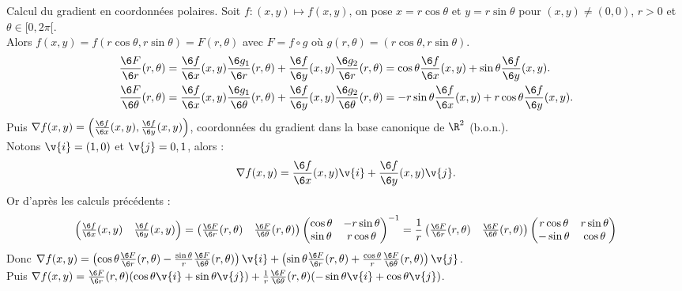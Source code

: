\documentclass[11pt]{article}
\begin{document}
\begin{exercice}{Calcul du gradient en coordonnées polaires.}{}
    Soit $f:(x,y)\mapsto f(x,y)$, on pose $x=r\cos\theta$ et $y=r\sin\theta$ pour $(x,y)\neq(0,0)$, $r>0$ et $\theta\in[0,2\pi[$.\\
    Alors $f(x,y)=f(r\cos\theta, r\sin\theta)=F(r,\theta)$ avec $F=f\circ g$ où $g(r,\theta)=(r\cos\theta,r\sin\theta)$.
    \begin{align*}
        &\frac{\6 F}{\6 r}(r,\theta) = \frac{\6 f}{\6 x}(x,y)\frac{\6 g_1}{\6 r}(r,\theta) + \frac{\6 f}{\6 y}(x,y)\frac{\6 g_2}{\6 r}(r,\theta) = \cos\theta\frac{\6 f}{\6 x}(x,y) + \sin\theta\frac{\6 f}{\6 y}(x,y).\\
        &\frac{\6 F}{\6 \theta}(r,\theta) = \frac{\6 f}{\6 x}(x,y)\frac{\6 g_1}{\6 \theta}(r, \theta) + \frac{\6 f}{\6 y}(x,y)\frac{\6 g_2}{\6 \theta}(r,\theta) = -r\sin\theta\frac{\6 f}{\6 x}(x,y)+r\cos\theta\frac{\6 f}{\6 y}(x,y).
    \end{align*} 
    Puis $\nabla f(x,y) = \left(\frac{\6 f}{\6 x}(x,y), \frac{\6 f}{\6 y}(x,y) \right)$, coordonnées du gradient dans la base canonique de $\R^2$ (b.o.n.).\\
    Notons $\v{i}=(1,0)$ et $\v{j}=0,1$, alors :
    \begin{equation*}
        \nabla f(x,y) = \frac{\6 f}{\6 x}(x,y)\v{i} + \frac{\6 f}{\6 y}(x,y)\v{j}.
    \end{equation*}
    Or d'après les calculs précédents :
    \begin{equation*}
        \begin{pmatrix} \frac{\6 f}{\6 x}(x,y) & \frac{\6 f}{\6 y}(x,y) \end{pmatrix} = \begin{pmatrix}\frac{\6 F}{\6 r}(r,\theta) & \frac{\6 F}{\6 \theta}(r,\theta)\end{pmatrix}\begin{pmatrix}\cos \theta & -r\sin \theta \\ \sin\theta & r\cos\theta\end{pmatrix}^{-1} = \frac{1}{r}\begin{pmatrix}\frac{\6 F}{\6 r}(r,\theta) & \frac{\6 F}{\6 \theta}(r,\theta)\end{pmatrix}\begin{pmatrix}r\cos\theta&r\sin\theta\\-\sin\theta&\cos\theta\end{pmatrix}
    \end{equation*}
    Donc $\nabla f(x,y) = \left( \cos\theta \frac{\6 F}{\6 r}(r,\theta) - \frac{\sin \theta}{r}\frac{\6 F}{\6 \theta}(r,\theta) \right)\v{i} + \left( \sin\theta\frac{\6 F}{\6 r}(r,\theta) + \frac{\cos\theta}{r}\frac{\6 F}{\6 \theta}(r,\theta) \right)\v{j}$.\\
    Puis $\nabla f(x,y) = \frac{\6 F}{\6 r}(r,\theta)(\cos \theta \v{i} + \sin\theta\v{j}) + \frac{1}{r}\frac{\6 F}{\6 \theta}(r,\theta)(-\sin\theta\v{i} + \cos\theta\v{j})$.
\end{exercice}
\end{document}
